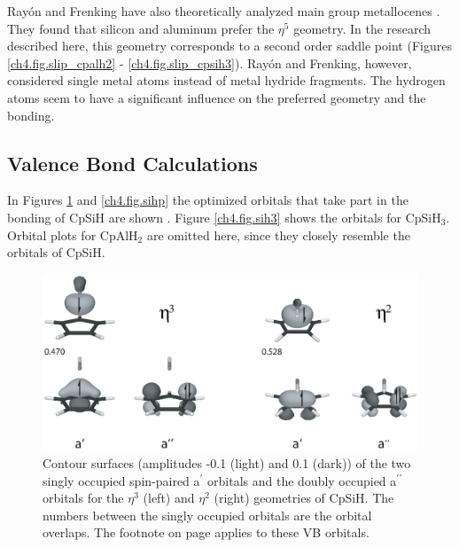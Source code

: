 Ray\'on and Frenking have also theoretically analyzed main group metallocenes \cite{rayon}. They found that silicon and aluminum prefer the $\eta^5$ geometry. In the research described here, this geometry corresponds to a second order saddle point (Figures \ref{ch4.fig.slip_cpalh2} - \ref{ch4.fig.slip_cpsih3}). Ray\'on and Frenking, however, considered single metal atoms instead of metal hydride fragments. The hydrogen atoms seem to have a significant influence on the preferred geometry and the bonding. 

\subsection{Valence Bond Calculations}

In Figures \ref{ch4.fig.sihs} and \ref{ch4.fig.sihp} the optimized orbitals that take part in the bonding of CpSiH are shown \cite{molden}. Figure \ref{ch4.fig.sih3} shows the orbitals for CpSiH$_3$. Orbital plots for CpAlH$_2$ are omitted here, since they closely resemble the orbitals of CpSiH. 

\begin{figure} [htbp]
\begin{center}
\includegraphics[scale=0.67]{cyclopentadienyl/figures/sih_sigma.eps}
\end{center}
\caption{Contour surfaces (amplitudes -0.1 (light) and 0.1 (dark)) of the two singly occupied spin-paired a$^\prime$ orbitals and the doubly occupied a$^{\prime\prime}$ orbitals for the $\eta^{3}$ (left) and $\eta^{2}$ (right) geometries of CpSiH. The numbers between the singly occupied orbitals are the orbital overlaps. The footnote on page \pageref{ch4.foot.consequence} applies to these VB orbitals.}
\label{ch4.fig.sihs}
\end{figure}

